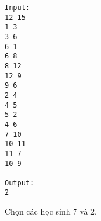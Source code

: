 \begin{verbatim}
Input:
12 15
1 3
3 6
6 1
6 8
8 12
12 9
9 6
2 4
4 5
5 2
4 6
7 10
10 11
11 7
10 9

Output:
2
\end{verbatim}

Chọn các học sinh 7 và 2.